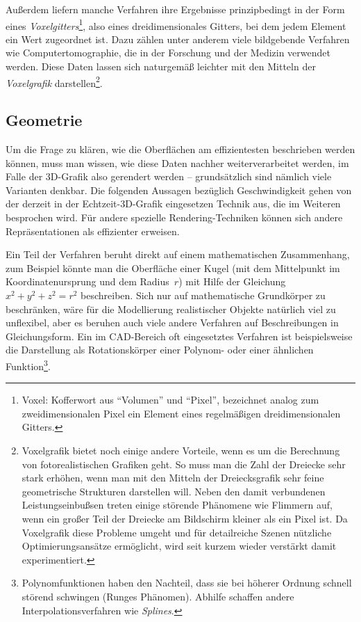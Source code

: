 Außerdem liefern manche Verfahren ihre Ergebnisse prinzipbedingt in der Form eines \emph{Voxelgitters}\footnote{Voxel: Kofferwort aus \enquote{Volumen} und \enquote{Pixel}, bezeichnet analog zum zweidimensionalen Pixel ein Element eines regelmäßigen dreidimensionalen Gitters.}, also eines dreidimensionales Gitters, bei dem jedem Element ein Wert zugeordnet ist. Dazu zählen unter anderem viele bildgebende Verfahren wie Computertomographie, die in der Forschung und der Medizin verwendet werden. Diese Daten lassen sich naturgemäß leichter mit den Mitteln der \emph{Voxelgrafik} darstellen\footnote{Voxelgrafik bietet noch einige andere Vorteile, wenn es um die Berechnung von fotorealistischen Grafiken geht. So muss man die Zahl der Dreiecke sehr stark erhöhen, wenn man mit den Mitteln der Dreiecksgrafik sehr feine geometrische Strukturen darstellen will. Neben den damit verbundenen Leistungseinbußsen treten einige störende Phänomene wie Flimmern auf, wenn ein großer Teil der Dreiecke am Bildschirm kleiner als ein Pixel ist. Da Voxelgrafik diese Probleme umgeht und für detailreiche Szenen nützliche Optimierungsansätze ermöglicht, wird seit kurzem wieder verstärkt damit experimentiert. }.

\subsection{Geometrie}
\label{vertex}
Um die Frage zu klären, wie die Oberflächen am effizientesten beschrieben werden können, muss man wissen, wie diese Daten nachher weiterverarbeitet werden, im Falle der 3D-Grafik also gerendert werden -- grundsätzlich sind nämlich viele Varianten denkbar. Die folgenden Aussagen bezüglich Geschwindigkeit gehen von der derzeit in der Echtzeit-3D-Grafik eingesetzen Technik aus, die im Weiteren besprochen wird. Für andere spezielle Rendering-Techniken können sich andere Repräsentationen als effizienter erweisen.

Ein Teil der Verfahren beruht direkt auf einem mathematischen Zusammenhang, zum Beispiel könnte man die Oberfläche einer Kugel (mit dem Mittelpunkt im Koordinatenursprung und dem Radius~$r$) mit Hilfe der Gleichung $x^2 + y^2 + z^2 = r^2$ beschreiben. Sich nur auf mathematische Grundkörper zu beschränken, wäre für die Modellierung realistischer Objekte natürlich viel zu unflexibel, aber es beruhen auch viele andere Verfahren auf Beschreibungen in Gleichungsform. Ein im CAD-Bereich oft eingesetztes Verfahren ist beispielsweise die Darstellung als Rotationskörper einer Polynom- oder einer ähnlichen Funktion\footnote{Polynomfunktionen haben den Nachteil, dass sie bei höherer Ordnung schnell störend schwingen (Runges Phänomen). Abhilfe schaffen andere Interpolationsverfahren wie \emph{Splines}. }.

